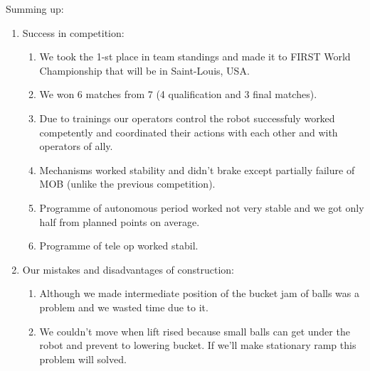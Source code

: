 Summing up:
\begin{enumerate}
	\item Success in competition:
	\begin{enumerate}
		\item We took the 1-st place in team standings and made it to FIRST World Championship that will be in Saint-Louis, USA.
		
		\item We won 6 matches from 7 (4 qualification and 3 final matches).
		
		\item Due to trainings our operators control the robot successfuly worked competently and coordinated their actions with each other and with operators of ally.
		
		\item Mechanisms worked stability and didn't brake except partially failure of MOB (unlike the previous competition).
		
		\item Programme of autonomous period worked not very stable and we got only half from planned points  on average.
		
		\item Programme of tele op worked stabil.
		
	\end{enumerate}
	
	\item Our mistakes and disadvantages of construction:
	\begin{enumerate}
		\item Although we made intermediate position of the bucket jam of balls was a problem and we wasted time due to it.
		
		\item We couldn't move when lift rised because small balls can get under the robot and prevent to lowering bucket. If we'll make stationary ramp this problem will solved.
		
	\end{enumerate}
	

\end{enumerate}
